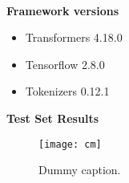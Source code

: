 %
%
\\
\textbf{Framework versions}
\begin{itemize}
    \item Transformers 4.18.0
    \item Tensorflow 2.8.0
    \item Tokenizers 0.12.1
\end{itemize}%
%
\pagebreak
\textbf{Test Set Results}
\begin{figure}[h]
    \centering
    \texttt{[image: cm]}
    \caption{
        Dummy caption.
    }
    \label{fig:cm}
\end{figure}
